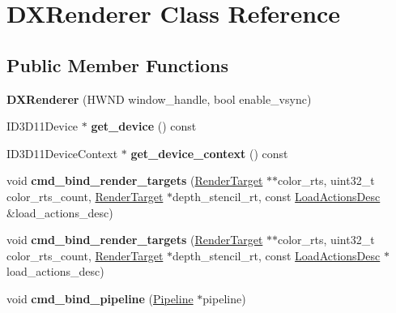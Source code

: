 \hypertarget{classDXRenderer}{}\section{D\+X\+Renderer Class Reference}
\label{classDXRenderer}
\subsection*{Public Member Functions}
\begin{DoxyCompactItemize}
\item 
\mbox{\label{classDXRenderer_a523a1ab5a6f1031bda1242fb105241b7}} 
{\bfseries D\+X\+Renderer} (H\+W\+ND window\+\_\+handle, bool enable\+\_\+vsync)
\item 
\mbox{\label{classDXRenderer_a93e38bbc88225a3244e336974674774b}} 
I\+D3\+D11\+Device $\ast$ {\bfseries get\+\_\+device} () const
\item 
\mbox{\label{classDXRenderer_ada893f000ff5b8bd2b0f24539f6be420}} 
I\+D3\+D11\+Device\+Context $\ast$ {\bfseries get\+\_\+device\+\_\+context} () const
\item 
\mbox{\label{classDXRenderer_a668f61d8e8ccad71f0f623c4fe05bb4e}} 
void {\bfseries cmd\+\_\+bind\+\_\+render\+\_\+targets} (\hyperlink{classRenderTarget}{Render\+Target} $\ast$$\ast$color\+\_\+rts, uint32\+\_\+t color\+\_\+rts\+\_\+count, \hyperlink{classRenderTarget}{Render\+Target} $\ast$depth\+\_\+stencil\+\_\+rt, const \hyperlink{structLoadActionsDesc}{Load\+Actions\+Desc} \&load\+\_\+actions\+\_\+desc)
\item 
\mbox{\label{classDXRenderer_a42a9e7def6fac47bbd405ea3c539d759}} 
void {\bfseries cmd\+\_\+bind\+\_\+render\+\_\+targets} (\hyperlink{classRenderTarget}{Render\+Target} $\ast$$\ast$color\+\_\+rts, uint32\+\_\+t color\+\_\+rts\+\_\+count, \hyperlink{classRenderTarget}{Render\+Target} $\ast$depth\+\_\+stencil\+\_\+rt, const \hyperlink{structLoadActionsDesc}{Load\+Actions\+Desc} $\ast$load\+\_\+actions\+\_\+desc)
\item 
\mbox{\label{classDXRenderer_a0196dde6384481e256d7b3d253a1520d}} 
void {\bfseries cmd\+\_\+bind\+\_\+pipeline} (\hyperlink{classPipeline}{Pipeline} $\ast$pipeline)

\end{DoxyCompactItemize}
